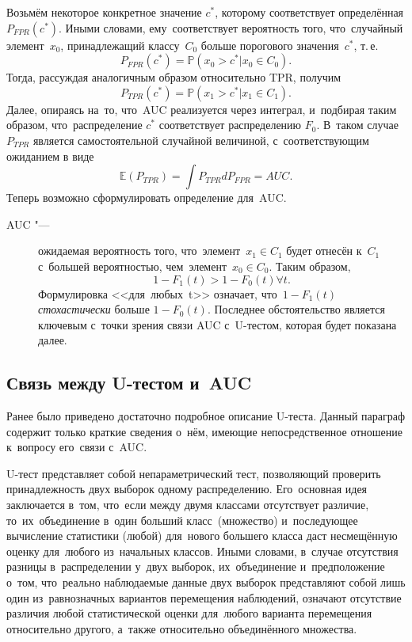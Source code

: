 \documentclass[]{scrreprt}
\begin{document}
Возьмём некоторое конкретное значение $c^{*}$, которому соответствует определённая $P_{FPR}(c^{*})$. Иными словами, ему~соответствует вероятность того, что~случайный элемент~$x_{0}$, принадлежащий классу~$C_{0}$ больше порогового значения~$c^{*}$, т.\,е.
\begin{equation}\label{eq:AUC-computation-3}
P_{FPR}(c^{*}) = \mathbb{P}(x_{0}>c^{*}|x_{0} \in C_{0}).
\end{equation}
Тогда, рассуждая аналогичным образом относительно TPR, получим
\begin{equation}\label{eq:AUC-computation-4}
P_{TPR}(c^{*}) = \mathbb{P}(x_{1}>c^{*}|x_{1} \in C_{1}).
\end{equation}
Далее, опираясь на~то, что~AUC реализуется через интеграл, и~подбирая  таким образом, что~распределение $c^{*}$ соответствует распределению $F_{0}$. В~таком случае $P_{TPR}$ является самостоятельной случайной величиной, с~соответствующим ожиданием в виде
\begin{equation}\label{eq:AUC-computation-integral}
\mathbb{E}(P_{TPR}) = \int P_{TPR} d P_{FPR} = AUC.
\end{equation}
Теперь возможно сформулировать определение для~AUC.
\begin{description}
	\item[AUC "---] ожидаемая вероятность того, что~элемент~$x_{1} \in C_{1}$ будет отнесён к~$C_{1}$ с~большей вероятностью, чем~элемент~$x_{0} \in C_{0}$. Таким образом,
	\begin{equation}\label{eq:AUC-definition}
	1-F_{1}(t)>1-F_{0}(t) \forall t.
	\end{equation}
	Формулировка <<для~любых~t>> означает, что~$1-F_{1}(t)$ \emph{стохастически} больше $1-F_{0}(t)$. Последнее обстоятельство является ключевым с~точки зрения связи AUC с~U-тестом, которая будет показана далее.
\end{description}
%
\subsection{Связь между U-тестом и~AUC}
Ранее было приведено достаточно подробное описание U-теста. Данный параграф содержит только краткие сведения о~нём, имеющие непосредственное отношение к~вопросу его~связи с~AUC.

U-тест представляет собой непараметрический тест, позволяющий проверить принадлежность двух выборок одному распределению. Его~основная идея заключается в~том, что~если между двумя классами отсутствует различие, то~их~объединение в~один больший класс~(множество) и~последующее вычисление статистики (любой) для~нового большего класса даст несмещённую оценку для~любого из~начальных классов. Иными словами, в~случае отсутствия разницы в~распределении у~двух выборок, их~объединение и~предположение о~том, что~реально наблюдаемые данные двух выборок представляют собой лишь один из~равнозначных вариантов перемещения наблюдений, означают отсутствие различия любой статистической оценки для~любого варианта перемещения относительно другого, а~также относительно объединённого множества.
\end{document}
